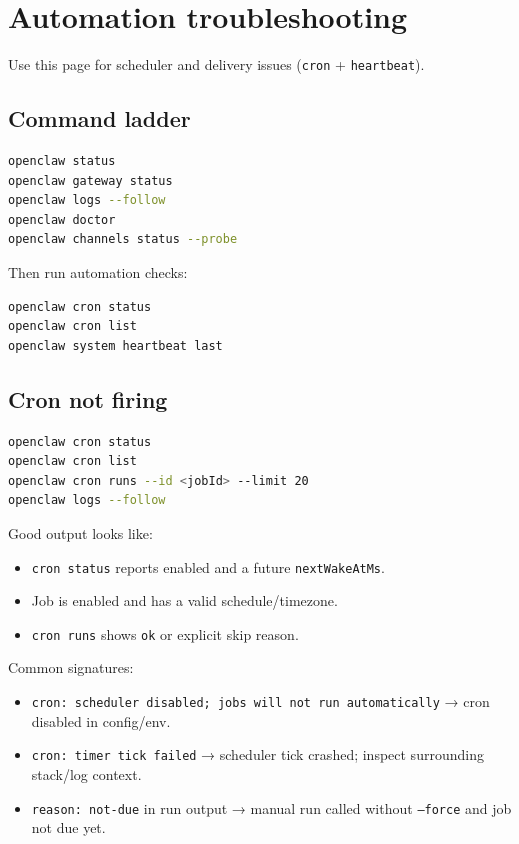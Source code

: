 \section{Automation troubleshooting}


Use this page for scheduler and delivery issues (\texttt{cron} + \texttt{heartbeat}).

\subsection{Command ladder}


\begin{lstlisting}[language=bash]
openclaw status
openclaw gateway status
openclaw logs --follow
openclaw doctor
openclaw channels status --probe
\end{lstlisting}


Then run automation checks:

\begin{lstlisting}[language=bash]
openclaw cron status
openclaw cron list
openclaw system heartbeat last
\end{lstlisting}


\subsection{Cron not firing}


\begin{lstlisting}[language=bash]
openclaw cron status
openclaw cron list
openclaw cron runs --id <jobId> --limit 20
openclaw logs --follow
\end{lstlisting}


Good output looks like:

\begin{itemize}
  \item \texttt{cron status} reports enabled and a future \texttt{nextWakeAtMs}.
  \item Job is enabled and has a valid schedule/timezone.
  \item \texttt{cron runs} shows \texttt{ok} or explicit skip reason.
\end{itemize}


Common signatures:

\begin{itemize}
  \item \texttt{cron: scheduler disabled; jobs will not run automatically} → cron disabled in config/env.
  \item \texttt{cron: timer tick failed} → scheduler tick crashed; inspect surrounding stack/log context.
  \item \texttt{reason: not-due} in run output → manual run called without \texttt{--force} and job not due yet.
\end{itemize}


